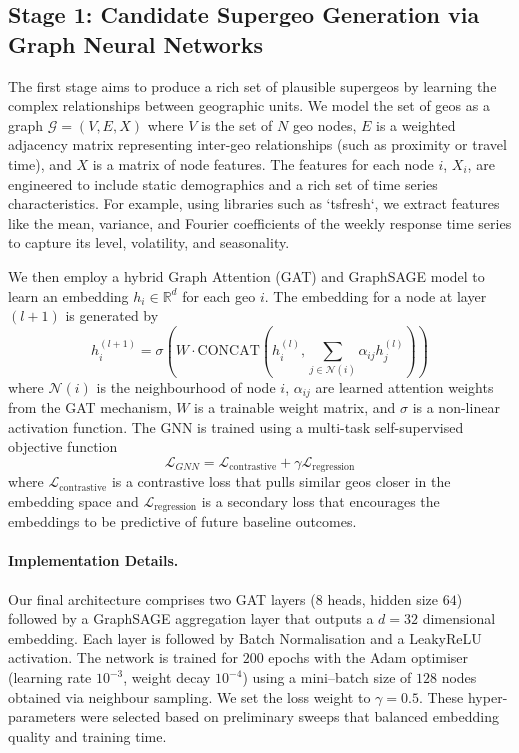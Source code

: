 \documentclass[final,3p,fleqn, 10pt]{elsarticle}
\begin{document}
    \subsection{Stage 1: Candidate Supergeo Generation via Graph Neural Networks}
    The first stage aims to produce a rich set of plausible supergeos by learning the complex relationships between geographic units. We model the set of geos as a graph $\mathcal{G} = (V, E, X)$ where $V$ is the set of $N$ geo nodes, $E$ is a weighted adjacency matrix representing inter-geo relationships (such as proximity or travel time), and $X$ is a matrix of node features. The features for each node $i$, $X_i$, are engineered to include static demographics and a rich set of time series characteristics. For example, using libraries such as `tsfresh`, we extract features like the mean, variance, and Fourier coefficients of the weekly response time series to capture its level, volatility, and seasonality.

    We then employ a hybrid Graph Attention (GAT) and GraphSAGE model to learn an embedding $h_i \in \mathbb{R}^d$ for each geo $i$. The embedding for a node at layer $(l+1)$ is generated by
    $$ h_i^{(l+1)} = \sigma\left(W \cdot \text{CONCAT}\left(h_i^{(l)}, \sum_{j \in \mathcal{N}(i)} \alpha_{ij} h_j^{(l)}\right)\right) $$
    where $\mathcal{N}(i)$ is the neighbourhood of node $i$, $\alpha_{ij}$ are learned attention weights from the GAT mechanism, $W$ is a trainable weight matrix, and $\sigma$ is a non-linear activation function. The GNN is trained using a multi-task self-supervised objective function
    $$ \mathcal{L}_{GNN} = \mathcal{L}_{\text{contrastive}} + \gamma \mathcal{L}_{\text{regression}} $$
    where $\mathcal{L}_{\text{contrastive}}$ is a contrastive loss that pulls similar geos closer in the embedding space and $\mathcal{L}_{\text{regression}}$ is a secondary loss that encourages the embeddings to be predictive of future baseline outcomes.

    \paragraph{Implementation Details.} Our final architecture comprises two GAT layers (8 heads, hidden size $64$) followed by a GraphSAGE aggregation layer that outputs a $d=32$ dimensional embedding. Each layer is followed by Batch Normalisation and a LeakyReLU activation. The network is trained for $200$ epochs with the Adam optimiser (learning rate $10^{-3}$, weight decay $10^{-4}$) using a mini--batch size of $128$ nodes obtained via neighbour sampling. We set the loss weight to $\gamma = 0.5$. These hyper-parameters were selected based on preliminary sweeps that balanced embedding quality and training time.
\end{document}

